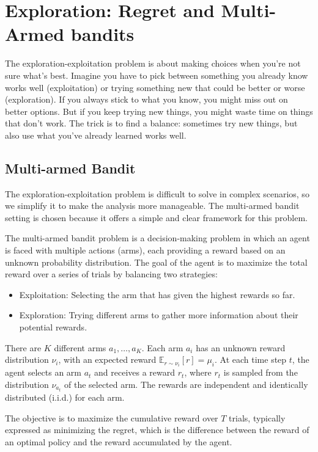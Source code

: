\chapter{Exploration: Regret and Multi-Armed bandits}

The exploration-exploitation problem is about making choices when you're not sure what's best.
Imagine you have to pick between something you already know works well (exploitation) or trying something new that could be better or worse (exploration).
If you always stick to what you know, you might miss out on better options.
But if you keep trying new things, you might waste time on things that don’t work.
The trick is to find a balance: sometimes try new things, but also use what you've already learned works well.

\section{Multi-armed Bandit}

The exploration-exploitation problem is difficult to solve in complex scenarios, so we simplify it to make the analysis more manageable. The multi-armed bandit setting is chosen because it offers a simple and clear framework for this problem.

The multi-armed bandit problem is a decision-making problem in which an agent is faced with multiple actions (arms), each providing a reward based on an unknown probability distribution. The goal of the agent is to maximize the total reward over a series of trials by balancing two strategies:

\begin{itemize}
    \item Exploitation: Selecting the arm that has given the highest rewards so far.
    \item Exploration: Trying different arms to gather more information about their potential rewards.
\end{itemize}

There are $K$ different arms $a_1, \dots, a_K$. Each arm $a_i$ has an unknown reward distribution $\nu_i$, with an expected reward $\mathbb{E}_{r \sim \nu_i}[r] = \mu_i$. At each time step $t$, the agent selects an arm $a_t$ and receives a reward $r_t$, where $r_t$ is sampled from the distribution $\nu_{a_t}$ of the selected arm. The rewards are independent and identically distributed (i.i.d.) for each arm.

The objective is to maximize the cumulative reward over $T$ trials, typically expressed as minimizing the regret, which is the difference between the reward of an optimal policy and the reward accumulated by the agent.

